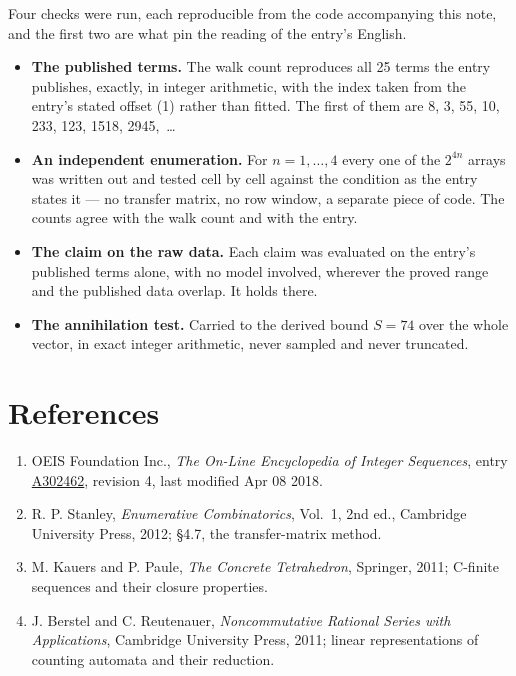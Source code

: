 \documentclass[11pt]{article}
\theoremstyle{definition}
\begin{document}
Four checks were run, each reproducible from the code accompanying this note, and the first two are what pin the reading of the entry's English.

\begin{itemize}

\item {\bfseries The published terms.} The walk count reproduces all 25 terms the entry publishes, exactly, in integer arithmetic, with the index taken from the entry's stated offset (1) rather than fitted. The first of them are 8, 3, 55, 10, 233, 123, 1518, 2945,~\dots

\item {\bfseries An independent enumeration.} For $n = 1,\dots,4$ every one of the $2^{4n}$ arrays was written out and tested cell by cell against the condition as the entry states it --- no transfer matrix, no row window, a separate piece of code. The counts agree with the walk count and with the entry.

\item {\bfseries The claim on the raw data.} Each claim was evaluated on the entry's published terms alone, with no model involved, wherever the proved range and the published data overlap. It holds there.

\item {\bfseries The annihilation test.} Carried to the derived bound $S = 74$ over the whole vector, in exact integer arithmetic, never sampled and never truncated.

\end{itemize}

\section{References}

\begin{enumerate}

\item OEIS Foundation Inc., \emph{The On-Line Encyclopedia of Integer Sequences}, entry \href{https://oeis.org/A302462}{A302462}, revision 4, last modified Apr 08 2018.

\item R. P. Stanley, \emph{Enumerative Combinatorics}, Vol.~1, 2nd ed., Cambridge University Press, 2012; \S4.7, the transfer-matrix method.

\item M. Kauers and P. Paule, \emph{The Concrete Tetrahedron}, Springer, 2011; C-finite sequences and their closure properties.

\item J. Berstel and C. Reutenauer, \emph{Noncommutative Rational Series with Applications}, Cambridge University Press, 2011; linear representations of counting automata and their reduction.

\end{enumerate}
\end{document}
